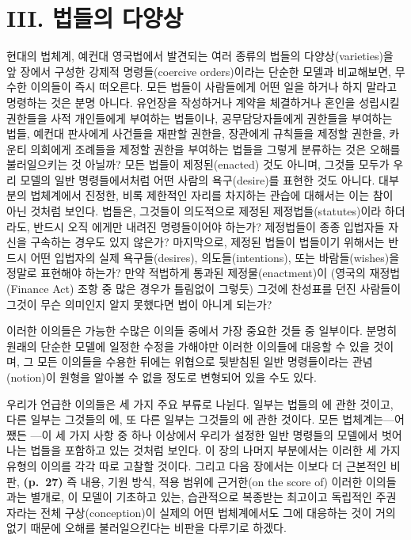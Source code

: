 \section{III. 법들의
다양상}\label{iii.-uxbc95uxb4e4uxc758-uxb2e4uxc591uxc0c1}

현대의 법체계, 예컨대 영국법에서 발견되는 여러 종류의 법들의
다양상(varieties)을 앞 장에서 구성한 강제적 명령들(coercive
orders)이라는 단순한 모델과 비교해보면, 무수한 이의들이 즉시 떠오른다.
모든 법들이 사람들에게 어떤 일을 하거나 하지 말라고 명령하는 것은 분명
아니다. 유언장을 작성하거나 계약을 체결하거나 혼인을 성립시킬 권한들을
사적 개인들에게 부여하는 법들이나, 공무담당자들에게 권한들을 부여하는
법들, 예컨대 판사에게 사건들을 재판할 권한을, 장관에게 규칙들을 제정할
권한을, 카운티 의회에게 조례들을 제정할 권한을 부여하는 법들을 그렇게
분류하는 것은 오해를 불러일으키는 것 아닐까? 모든 법들이 제정된(enacted)
것도 아니며, 그것들 모두가 우리 모델의 일반 명령들에서처럼 어떤 사람의
욕구(desire)를 표현한 것도 아니다. 대부분의 법체계에서 진정한, 비록
제한적인 자리를 차지하는 관습에 대해서는 이는 참이 아닌 것처럼 보인다.
법들은, 그것들이 의도적으로 제정된 제정법들(statutes)이라 하더라도,
반드시 오직 에게만 내려진 명령들이어야 하는가? 제정법들이
종종 입법자들 자신을 구속하는 경우도 있지 않은가? 마지막으로, 제정된
법들이 법들이기 위해서는 반드시 어떤 입법자의 실제 욕구들(desires),
의도들(intentions), 또는 바람들(wishes)을 정말로 표현해야 하는가? 만약
적법하게 통과된 제정물(enactment)이 (영국의 재정법(Finance Act) 조항 중
많은 경우가 틀림없이 그렇듯) 그것에 찬성표를 던진 사람들이 그것이 무슨
의미인지 알지 못했다면 법이 아니게 되는가?

이러한 이의들은 가능한 수많은 이의들 중에서 가장 중요한 것들 중
일부이다. 분명히 원래의 단순한 모델에 일정한 수정을 가해야만 이러한
이의들에 대응할 수 있을 것이며, 그 모든 이의들을 수용한 뒤에는 위협으로
뒷받침된 일반 명령들이라는 관념(notion)이 원형을 알아볼 수 없을 정도로
변형되어 있을 수도 있다.

우리가 언급한 이의들은 세 가지 주요 부류로 나뉜다. 일부는 법들의
에 관한 것이고, 다른 일부는 그것들의 에, 또 다른 일부는 그것들의 에 관한 것이다. 모든 법체계는---어쨌든
---이 세 가지 사항 중 하나 이상에서 우리가 설정한
일반 명령들의 모델에서 벗어나는 법들을 포함하고 있는 것처럼 보인다. 이
장의 나머지 부분에서는 이러한 세 가지 유형의 이의를 각각 따로 고찰할
것이다. 그리고 다음 장에서는 이보다 더 근본적인 비판, \textbf{(p.~27)}
즉 내용, 기원 방식, 적용 범위에 근거한(on the score of) 이러한
이의들과는 별개로, 이 모델이 기초하고 있는, 습관적으로 복종받는 최고이고
독립적인 주권자라는 전체 구상(conception)이 실제의 어떤 법체계에서도
그에 대응하는 것이 거의 없기 때문에 오해를 불러일으킨다는 비판을
다루기로 하겠다.

